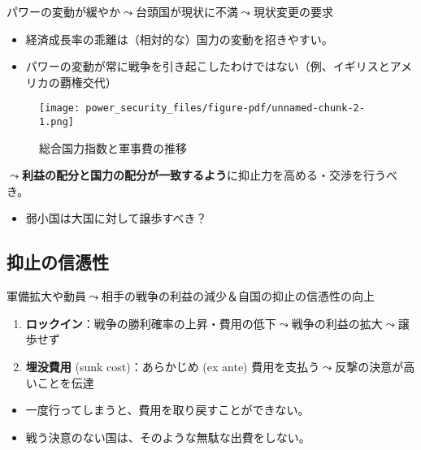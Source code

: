 \documentclass[
  xelatex,
  ja=standard]{bxjsarticle}
\providecommand{\tightlist}{%
  \setlength{\itemsep}{0pt}\setlength{\parskip}{0pt}}\usepackage{longtable,booktabs,array}
\begin{document}
パワーの変動が緩やか\(\leadsto\)台頭国が現状に不満\(\leadsto\)現状変更の要求\citep{gilpin2022}

\begin{itemize}
\tightlist
\item
  経済成長率の乖離は（相対的な）国力の変動を招きやすい。
\item
  パワーの変動が常に戦争を引き起こしたわけではない（例、イギリスとアメリカの覇権交代）
\end{itemize}

\begin{figure}[htpb]

{\centering \texttt{[image: power\_security\_files/figure-pdf/unnamed-chunk-2-1.png]}

}

\caption{総合国力指数と軍事費の推移}

\end{figure}

\(\leadsto\)\textbf{利益の配分と国力の配分が一致するよう}に抑止力を高める・交渉を行うべき。

\begin{itemize}
\tightlist
\item
  弱小国は大国に対して譲歩すべき？
\end{itemize}

\hypertarget{ux6291ux6b62ux306eux4fe1ux6191ux6027}{%
\subsection{抑止の信憑性}\label{ux6291ux6b62ux306eux4fe1ux6191ux6027}}

軍備拡大や動員\(\leadsto\)相手の戦争の利益の減少＆自国の抑止の信憑性の向上\citep{fearon1997}

\begin{enumerate}
\def\labelenumi{\arabic{enumi}.}
\tightlist
\item
  \textbf{ロックイン}：戦争の勝利確率の上昇・費用の低下\(\leadsto\)戦争の利益の拡大\(\leadsto\)譲歩せず
\item
  \textbf{埋没費用} (sunk cost)：あらかじめ (ex ante)
  費用を支払う\(\leadsto\)反撃の決意が高いことを伝達
\end{enumerate}

\begin{itemize}
\tightlist
\item
  一度行ってしまうと、費用を取り戻すことができない。
\item
  戦う決意のない国は、そのような無駄な出費をしない。
\end{itemize}
\end{document}
